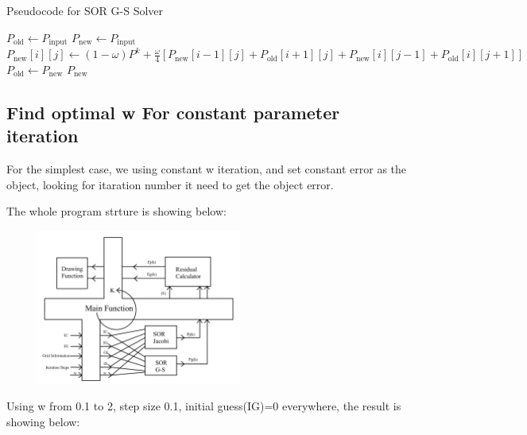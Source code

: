 \documentclass[12pt]{article}
\begin{document}
\begin{algorithm}
    \caption{Pseudocode for SOR G-S Solver}
    \begin{algorithmic}[1]
        \State $P_{\text{old}} \gets P_{\text{input}}$
        \State $P_{\text{new}} \gets P_{\text{input}}$
                \State $P_{\text{new}}[i][j] \gets 
                (1-\omega)P^{k} + \frac{\omega}{4} \left[ P_{\text{new}}[i-1][j] + P_{\text{old}}[i+1][j] + P_{\text{new}}[i][j-1] + P_{\text{old}}[i][j+1] \right]$
                \State $P_{\text{old}} \gets P_{\text{new}}$
            \EndFor
        \EndFor
        \State \Return $P_{\text{new}}$
        \EndFunction
    \end{algorithmic}
\end{algorithm}
    





\subsection{Find optimal w For constant parameter iteration}

For the simplest case, we using constant w iteration, and set constant error
as the object, looking for itaration number it need to get the object error.


The whole program strture is showing below:

\begin{figure}[H]
    \centering
    \includegraphics[width=0.6\textwidth]{diagram2.jpg}
    \label{diagram.jpg}
\end{figure}






Using w from 0.1 to 2, step size 0.1, initial guess(IG)=0 everywhere,
the result is showing below:
\end{document}
